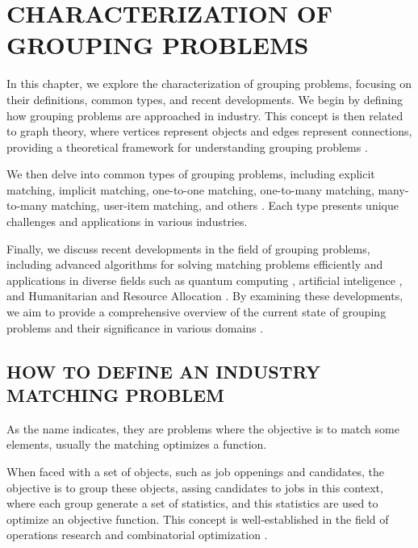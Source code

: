 \chapter{CHARACTERIZATION OF GROUPING PROBLEMS} \label{chap:grouping_problems} 

    In this chapter, we explore the characterization of grouping problems, focusing on their definitions, common types, and recent developments. We begin by defining how grouping problems are approached in industry. This concept is then related to graph theory, where vertices represent objects and edges represent connections, providing a theoretical framework for understanding grouping problems \cite{newman2018networks}.
    
    We then delve into common types of grouping problems, including explicit matching, implicit matching, one-to-one matching, one-to-many matching, many-to-many matching, user-item matching, and others \cite{gusfield1989stable, demange1986multi}. Each type presents unique challenges and applications in various industries.
    
    Finally, we discuss recent developments in the field of grouping problems, including advanced algorithms for solving matching problems efficiently and applications in diverse fields such as quantum computing \cite{quantum_matching}, artificial inteligence \cite{gnn_graph_matching, cross_modal_matching}, and Humanitarian and Resource Allocation \cite{humanitarian_routing}. By examining these developments, we aim to provide a comprehensive overview of the current state of grouping problems and their significance in various domains \cite{ieee_survey}.
    
\section{HOW TO DEFINE AN INDUSTRY MATCHING PROBLEM}

    As the name indicates, they are problems where the objective is to match some elements, usually the matching optimizes a function.
    
    When faced with a set of objects, such as job oppenings and candidates, the objective is to group these objects, assing candidates to jobs in this context, where each group generate a set of statistics, and this statistics are used to optimize an objective function. This concept is well-established in the field of operations research and combinatorial optimization \cite{manlove2013algorithmics}.

